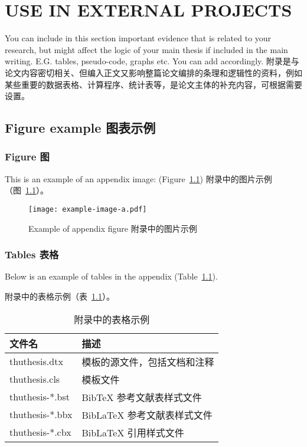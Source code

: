 
\chapter{USE IN EXTERNAL PROJECTS}

You can include in this section important evidence that is related to your research, but might affect the logic of your main thesis if included in the main writing. E.G. tables, pseudo-code, graphs etc. You can add accordingly.
附录是与论文内容密切相关、但编入正文又影响整篇论文编排的条理和逻辑性的资料，例如某些重要的数据表格、计算程序、统计表等，是论文主体的补充内容，可根据需要设置。

\section{Figure example 图表示例}

\subsection{Figure 图}

This is an example of an appendix image: (Figure~\ref{fig:appendix-figure})
附录中的图片示例（图~\ref{fig:appendix-figure}）。

\begin{figure}
  \centering
  \texttt{[image: example-image-a.pdf]}
  \caption{Example of appendix figure 附录中的图片示例}
  \label{fig:appendix-figure}
\end{figure}

\subsection{Tables 表格}

Below is an example of tables in the appendix (Table~\ref{tab:appendix-table}).

附录中的表格示例（表~\ref{tab:appendix-table}）。

\begin{table}
  \centering
  \caption{附录中的表格示例}
  \begin{tabular}{ll}
    \toprule
    文件名          & 描述                         \\
    \midrule
    thuthesis.dtx   & 模板的源文件，包括文档和注释 \\
    thuthesis.cls   & 模板文件                     \\
    thuthesis-*.bst & BibTeX 参考文献表样式文件    \\
    thuthesis-*.bbx & BibLaTeX 参考文献表样式文件  \\
    thuthesis-*.cbx & BibLaTeX 引用样式文件        \\
    \bottomrule
  \end{tabular}
  \label{tab:appendix-table}
\end{table}


